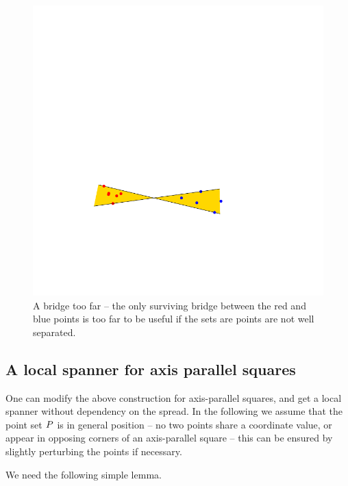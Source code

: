 \documentclass[12pt]{article}%
\begin{document}
\begin{figure}[h]
    \hfill%
    \includegraphics[page=3]{figs/bad_example}
    \hfill%
    \phantom{}
    \caption{A bridge too far -- the only surviving bridge between the
       red and blue points is too far to be useful if the sets are
       points are not well separated.}
\end{figure}





\subsection{A local spanner for axis parallel squares}

One can modify the above construction for axis-parallel squares, and
get a local spanner without dependency on the spread.  In the
following we assume that the point set $P$ is in general position --
no two points share a coordinate value, or appear in opposing corners
of an axis-parallel square -- this can be ensured by slightly
perturbing the points if necessary.

We need the following simple lemma.
\end{document}
